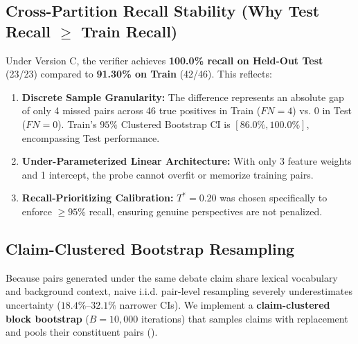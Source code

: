 \documentclass[11pt,a4paper]{article}
\begin{document}
\subsection{Cross-Partition Recall Stability (Why Test Recall $\ge$ Train Recall)}
Under Version C, the verifier achieves \textbf{100.0\% recall on Held-Out Test} (23/23) compared to \textbf{91.30\% on Train} (42/46). This reflects:
\begin{enumerate}[leftmargin=*,itemsep=1pt]
    \item \textbf{Discrete Sample Granularity:} The difference represents an absolute gap of only 4 missed pairs across 46 true positives in Train ($FN = 4$) vs. 0 in Test ($FN = 0$). Train's $95\%$ Clustered Bootstrap CI is $[86.0\%, 100.0\%]$, encompassing Test performance.
    \item \textbf{Under-Parameterized Linear Architecture:} With only 3 feature weights and 1 intercept, the probe cannot overfit or memorize training pairs.
    \item \textbf{Recall-Prioritizing Calibration:} $T^* = 0.20$ was chosen specifically to enforce $\ge 95\%$ recall, ensuring genuine perspectives are not penalized.
\end{enumerate}

\subsection{Claim-Clustered Bootstrap Resampling}
Because pairs generated under the same debate claim share lexical vocabulary and background context, naive i.i.d. pair-level resampling severely underestimates uncertainty ($18.4\%$--$32.1\%$ narrower CIs). We implement a \textbf{claim-clustered block bootstrap} ($B = 10,000$ iterations) that samples claims with replacement and pools their constituent pairs ().
\end{document}
